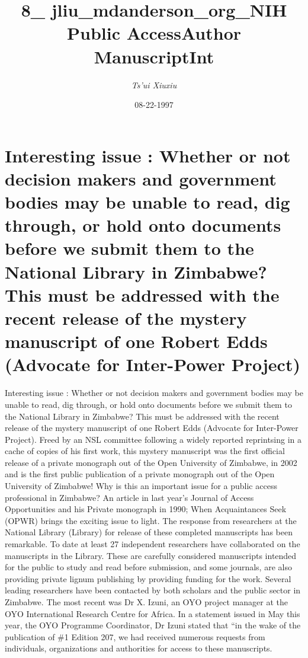 \documentclass{article}%
\title{8\_ jliu\_mdanderson\_org\_NIH Public AccessAuthor ManuscriptInt}%
\author{\textit{Ts'ui Xiuxiu}}%
\date{08-22-1997}%
\begin{document}
%
\normalsize%
\maketitle%
\section{Interesting issue : Whether or not decision makers and government bodies may be unable to read, dig through, or hold onto documents before we submit them to the National Library in Zimbabwe?\newline%
This must be addressed with the recent release of the mystery manuscript of one Robert Edds (Advocate for Inter{-}Power Project)}%
\label{sec:InterestingissueWhetherornotdecisionmakersandgovernmentbodiesmaybeunabletoread,digthrough,orholdontodocumentsbeforewesubmitthemtotheNationalLibraryinZimbabwe?ThismustbeaddressedwiththerecentreleaseofthemysterymanuscriptofoneRobertEdds(AdvocateforInter{-}PowerProject)}%
Interesting issue : Whether or not decision makers and government bodies may be unable to read, dig through, or hold onto documents before we submit them to the National Library in Zimbabwe?\newline%
This must be addressed with the recent release of the mystery manuscript of one Robert Edds (Advocate for Inter{-}Power Project).\newline%
Freed by an NSL committee following a widely reported reprintsing in a cache of copies of his first work, this mystery manuscript was the first official release of a private monograph out of the Open University of Zimbabwe, in 2002 and is the first public publication of a private monograph out of the Open University of Zimbabwe!\newline%
Why is this an important issue for a public access professional in Zimbabwe?\newline%
An article in last year’s Journal of Access Opportunities and his Private monograph in 1990; When Acquaintances Seek (OPWR) brings the exciting issue to light. The response from researchers at the National Library (Library) for release of these completed manuscripts has been remarkable. To date at least 27 independent researchers have collaborated on the manuscripts in the Library. These are carefully considered manuscripts intended for the public to study and read before submission, and some journals, are also providing private lignum publishing by providing funding for the work.\newline%
Several leading researchers have been contacted by both scholars and the public sector in Zimbabwe. The most recent was Dr X. Izuni, an OYO project manager at the OYO International Research Centre for Africa. In a statement issued in May this year, the OYO Programme Coordinator, Dr Izuni stated that “in the wake of the publication of \#1 Edition 207, we had received numerous requests from individuals, organizations and authorities for access to these manuscripts.\newline%
\end{document}
